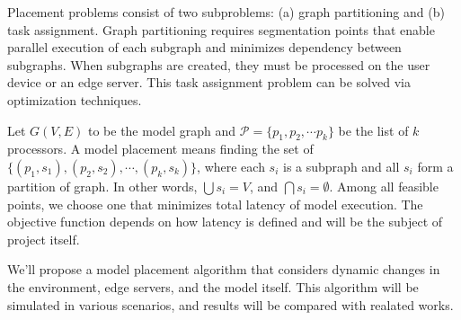 \documentclass[lettersize,journal]{IEEEtran}
\begin{document}
Placement problems consist of two subproblems: (a) graph partitioning and (b) task assignment. Graph partitioning requires segmentation points that enable parallel execution of each subgraph and minimizes dependency between subgraphs. When subgraphs are created, they must be processed on the user device or an edge server. This task assignment problem can be solved via optimization techniques.

Let $G(V, E)$ to be the model graph and $\mathcal{P} = \{p_1, p_2, \cdots p_k\}$ be the list of $k$ processors. A model placement means finding the set of $\{(p_1, s_1), (p_2, s_2), \cdots, (p_k, s_k)\}$, where each $s_i$ is a subpraph and all $s_i$ form a partition of graph. In other words, $\bigcup s_i = V$, and $\bigcap s_i = \emptyset$. Among all feasible points, we choose one that minimizes total latency of model execution. The objective function depends on how latency is defined and will be the subject of project itself.

We'll propose a model placement algorithm that considers dynamic changes in the environment, edge servers, and the model itself. This algorithm will be simulated in various scenarios, and results will be compared with realated works.



\end{document}
